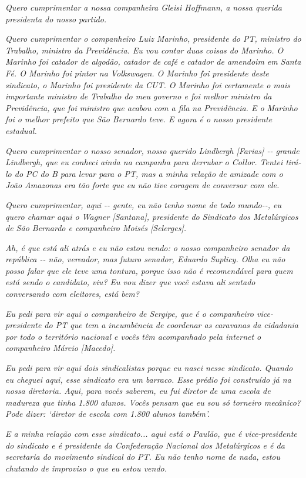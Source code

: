 \emph{Quero cumprimentar a nossa companheira Gleisi Hoffmann, a nossa
querida presidenta do nosso partido.}

\emph{Quero cumprimentar o companheiro Luiz Marinho, presidente do PT,
ministro do Trabalho, ministro da Previdência. Eu vou contar duas coisas
do Marinho. O Marinho foi catador de algodão, catador de café e catador
de amendoim em Santa Fé. O Marinho foi pintor na Volkswagen. O Marinho
foi presidente deste sindicato, o Marinho foi presidente da CUT. O
Marinho foi certamente o mais importante ministro de Trabalho do meu
governo e foi melhor ministro da Previdência, que foi ministro que
acabou com a fila na Previdência. E o Marinho foi o melhor prefeito que
São Bernardo teve. E agora é o nosso presidente estadual.~}

\emph{Quero cumprimentar o nosso senador, nosso querido Lindbergh
{[}Farias{]} -\/- grande Lindbergh, que eu conheci ainda na campanha
para derrubar o Collor. Tentei tirá-lo do PC do B para levar para o PT,
mas a minha relação de amizade com o João Amazonas era tão forte que eu
não tive coragem de conversar com ele.~}

\emph{Quero cumprimentar, aqui -\/- gente, eu não tenho nome de todo
mundo-\/-, eu quero chamar aqui o Wagner {[}Santana{]}, presidente do
Sindicato dos Metalúrgicos de São Bernardo e companheiro Moisés
{[}Selerges{]}.}

\emph{Ah, é que está ali atrás e eu não estou vendo: o nosso companheiro
senador da república -\/- não, vereador, mas futuro senador, Eduardo
Suplicy. Olha eu não posso falar que ele teve uma tontura, porque isso
não é recomendável para quem está sendo o candidato, viu? Eu vou dizer
que você estava ali sentado conversando com eleitores, está bem?~}

\emph{Eu pedi para vir aqui o companheiro de Sergipe, que é o
companheiro vice-presidente do PT que tem a incumbência de coordenar as
caravanas da cidadania por todo o território nacional e vocês têm
acompanhado pela internet o companheiro Márcio {[}Macedo{]}.~}

\emph{Eu pedi para vir aqui dois sindicalistas porque eu nasci nesse
sindicato. Quando eu cheguei aqui, esse sindicato era um barraco. Esse
prédio foi construído já na nossa diretoria. Aqui, para vocês saberem,
eu fui diretor de uma escola de madureza que tinha 1.800 alunos. Vocês
pensam que eu sou só torneiro mecânico? Pode dizer: `diretor de escola
com 1.800 alunos também'.~}

\emph{E a minha relação com esse sindicato... aqui está o Paulão, que é
vice-presidente do sindicato e é presidente da Confederação Nacional dos
Metalúrgicos e é da secretaria do movimento sindical do PT. Eu não tenho
nome de nada, estou chutando de improviso o que eu estou vendo.}


